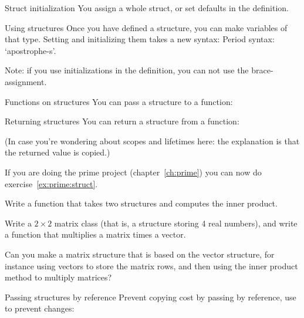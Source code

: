 \begin{block}{Struct initialization}
  \label{sl:structinit}
  You assign a whole struct, or set defaults in the definition.
\end{block}

\begin{block}{Using structures}
  \label{sl:struct-use}
  Once you have defined a structure, you can make variables of that
  type. Setting and initializing them takes a new syntax:
  Period syntax: `apostrophe-s'.
\end{block}

Note: if you use initializations in the  definition,
you can not use the brace-assignment.

\begin{block}{Functions on structures}
  \label{sl:struct-pass}
  You can pass a structure to a function:
\end{block}

\begin{block}{Returning structures}
  \label{sl:struct-return}
  You can return a structure from a function:

  (In case you're wondering about scopes and lifetimes here: the
  explanation is that the returned value is copied.)
\end{block}

\begin{exercise}
  \label{ex:primestruct}
  If you are doing the prime project (chapter~\ref{ch:prime}) you can
  now do exercise~\ref{ex:prime:struct}.
\end{exercise}

\begin{exercise}
  \label{ex:vecstruct}
  Write a function  that takes two 
  structures and computes the inner product.
\end{exercise}

\begin{exercise}
  \label{ex:matstruct}
  Write a $2\times 2$ matrix class (that is, a structure storing 4
  real numbers), and write a function 
  that multiplies a matrix times a vector.

  Can you make a matrix structure that is based on the vector
  structure, for instance using vectors to store the matrix rows, and
  then using the inner product method to multiply matrices?
\end{exercise}

\begin{block}{Passing structures by reference}
  \label{sl:struct-passref}
  Prevent copying cost by passing by reference, use  to
  prevent changes:
\end{block}



